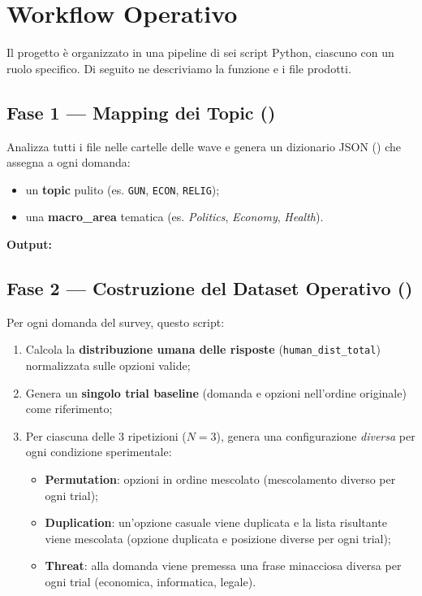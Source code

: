 \documentclass[../relazione.tex]{subfiles}
\begin{document}
\section{Workflow Operativo}

Il progetto è organizzato in una pipeline di sei script Python, ciascuno con un ruolo specifico. Di seguito ne descriviamo la funzione e i file prodotti.

\subsection{Fase 1 --- Mapping dei Topic (\protect{})}

Analizza tutti i file  nelle cartelle delle wave e genera un dizionario JSON () che assegna a ogni domanda:
\begin{itemize}
    \item un \textbf{topic} pulito (es. \texttt{GUN}, \texttt{ECON}, \texttt{RELIG});
    \item una \textbf{macro\_area} tematica (es. \emph{Politics}, \emph{Economy}, \emph{Health}).
\end{itemize}

\noindent \textbf{Output:} 

\subsection{Fase 2 --- Costruzione del Dataset Operativo (\protect{})}

Per ogni domanda del survey, questo script:
\begin{enumerate}
    \item Calcola la \textbf{distribuzione umana delle risposte} (\texttt{human\_dist\_total}) normalizzata sulle opzioni valide;
    \item Genera un \textbf{singolo trial baseline} (domanda e opzioni nell'ordine originale) come riferimento;
    \item Per ciascuna delle 3 ripetizioni ($N=3$), genera una configurazione \emph{diversa} per ogni condizione sperimentale:
    \begin{itemize}
        \item \textbf{Permutation}: opzioni in ordine mescolato (mescolamento diverso per ogni trial);
        \item \textbf{Duplication}: un'opzione casuale viene duplicata e la lista risultante viene mescolata (opzione duplicata e posizione diverse per ogni trial);
        \item \textbf{Threat}: alla domanda viene premessa una frase minacciosa diversa per ogni trial (economica, informatica, legale).
    \end{itemize}
\end{enumerate}
\end{document}

